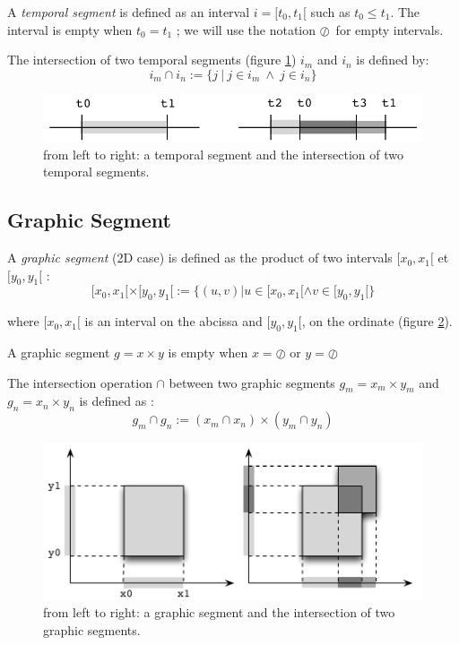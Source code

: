 \documentclass[letterpaper, 12pt]{article}
\newcommand{\emptyseg}		{\ensuremath{\oslash}}
\begin{document}
A \emph{temporal segment} is defined as an interval 
 $i=[t_{0},t_{1}[$ such as $t_{0} \leqslant t_{1}$. The interval is empty when $t_{0} = t_{1}$ ; we will use the notation \emptyseg\  for empty intervals.

The intersection of two temporal segments (figure \ref{fig:segment1D}) $i_m$ and $i_n$ is defined by: 
$$ i_{m} \cap i_{n}  := \{ j \ |\ j \in i_m \ \land\ j \in i_n \} $$


\begin{figure} %
\begin{center}
	\includegraphics[width=0.9\baseimgwidth]{imgs/segments1DG}
\caption{from left to right: a temporal segment and the intersection of two temporal segments.}
\label{fig:segment1D}
\end{center}
\end{figure}


\subsection{Graphic Segment}
A \emph{graphic segment} (2D case) is defined as the product of two intervals $[x_0,x_1[$ et $[y_0,y_1[$ :
$$ [x_0,x_1[ \times [y_0,y_1[ := \{ (u,v) | u \in [x_0,x_1[ \land v \in [y_0,y_1[ \} $$

where $[x_0,x_1[$ is an interval on the abcissa and $[y_0,y_1[$, on the ordinate (figure \ref{fig:segment2D}).

A graphic segment $g = x \times y$ is empty when $x = \emptyseg $ or $y = \emptyseg $

The intersection operation $\cap$ between two graphic segments $g_{m}=x_{m} \times y_{m}$ and $g_{n}=x_{n} \times y_{n}$ is defined as :
$$ g_{m} \cap g_{n} := (x_{m} \cap x_{n}) \times (y_{m} \cap y_{n}) $$

\begin{figure} %
\begin{center}
	\includegraphics[width=0.9\baseimgwidth]{imgs/segments2DG}
\caption{from left to right: a graphic segment and the intersection of  two graphic segments.}
\label{fig:segment2D}
\end{center}
\end{figure}
\end{document}
